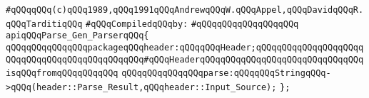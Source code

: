 \label{src/app/yacc/src/parse-gen-parser.api}
\verb|#qQQqqQQq(c)qQQq1989,qQQq1991qQQqAndrewqQQqW.qQQqAppel,qQQqDavidqQQqR.qQQqTarditiqQQq|\newline
\newline
\verb|#qQQqCompiledqQQqby:|\newline
\verb|#qQQqqQQqqQQqqQQqqQQq|\newline
\newline
\verb|apiqQQqParse_Gen_ParserqQQq{|\newline
\newline
\verb|qQQqqQQqqQQqqQQqpackageqQQqheader:qQQqqQQqHeader;qQQqqQQqqQQqqQQqqQQqqQQqqQQqqQQqqQQqqQQqqQQqqQQq#qQQqHeaderqQQqqQQqqQQqqQQqqQQqqQQqqQQqqQQqisqQQqfromqQQqqQQqqQQq|\newline
\newline
\verb|qQQqqQQqqQQqqQQqparse:qQQqqQQqStringqQQq->qQQq(header::Parse_Result,qQQqheader::Input_Source);|\newline
\verb|};|\newline
\newline


